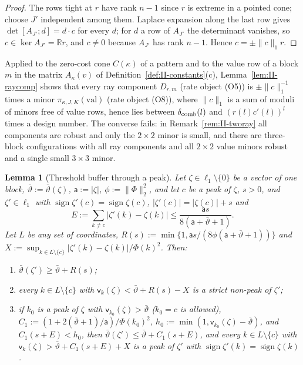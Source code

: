 \documentclass[10pt]{amsart}
\newtheorem{lemma}[theorem]{Lemma}
\theoremstyle{definition}
\theoremstyle{remark}
\newcommand{\sgn}{\operatorname{sign}}
\newcommand{\R}{\mathbb R}
\begin{document}
\begin{proof}
The rows tight at $r$ have rank $n-1$ since $r$ is extreme in a pointed
cone; choose $J'$ independent among them.  Laplace expansion along the last
row gives $\det[A_{J'};d]=d\cdot c$ for every $d$; for $d$ a row of $A_{J'}$
the determinant vanishes, so $c\in\ker A_{J'}=\R r$, and $c\ne0$ because
$A_{J'}$ has rank $n-1$.  Hence $c=\pm\|c\|_1r$.
\end{proof}

Applied to the zero-cost cone $C(\kappa)$ of a pattern and to the value row
of a block $m$ in the matrix $A_\kappa(v)$ of
Definition~\ref{def:II-constants}(c), Lemma~\ref{lem:II-raycomp} shows that
every ray component $D_{r,m}$ (rate object (O5)) is $\pm\|c\|_1^{-1}$ times
a minor $\pi_{\kappa,J,K}(\mathrm{val})$ (rate object (O8)), where $\|c\|_1$ is
a sum of moduli of minors free of value rows, hence lies between
$\delta_{\rm comb}(l)$ and $(r(l)c'(l))^l$ times a design number.  The
converse fails: in Remark~\ref{rem:II-tworay} all components are robust and
only the $2\times2$ minor is small, and there are three-block configurations
with all ray components and all $2\times2$ value minors robust and a single
small $3\times3$ minor.

\begin{lemma}[Threshold buffer through a peak]\label{lem:II-QB}
Let $\zeta\in\ell_1\setminus\{0\}$ be a vector of one block,
$\bar\vartheta:=\bar\vartheta(\zeta)$, $\mathsf a:=|\zeta|$,
$\phi:=\|\Phi\|_2^2$, and let $c$ be a peak of $\zeta$, $s>0$, and
$\zeta'\in\ell_1$ with $\sgn\zeta'(c)=\sgn\zeta(c)$, $|\zeta'(c)|=|\zeta(c)|+s$
and
\[
 E:=\sum_{k\ne c}|\zeta'(k)-\zeta(k)|\le\frac{\mathsf as}{8(\mathsf a+\bar\vartheta+1)} .
\]
Let $L$ be any set of coordinates, $R(s):=\min\{1,\mathsf as/(8\phi(\mathsf a+
\bar\vartheta+1))\}$ and $X:=\sup_{k\in L\setminus\{c\}}|\zeta'(k)-\zeta(k)|/
\Phi(k)^2$.  Then:
\begin{enumerate}
\item[(a)] $\bar\vartheta(\zeta')\ge\bar\vartheta+R(s)$;
\item[(b)] every $k\in L\setminus\{c\}$ with $\mathsf v_k(\zeta)<\bar\vartheta+
R(s)-X$ is a strict non-peak of $\zeta'$;
\item[(c)] if $k_0$ is a peak of $\zeta$ with $\mathsf v_{k_0}(\zeta)>\bar\vartheta$
\textup{(}$k_0=c$ is allowed\textup{)}, $C_1:=(1+2(\bar\vartheta+1)/\mathsf a)/
\Phi(k_0)^2$, $h_0:=\min(1,\mathsf v_{k_0}(\zeta)-\bar\vartheta)$, and
$C_1(s+E)<h_0$, then $\bar\vartheta(\zeta')\le\bar\vartheta+C_1(s+E)$, and every
$k\in L\setminus\{c\}$ with $\mathsf v_k(\zeta)>\bar\vartheta+C_1(s+E)+X$ is a
peak of $\zeta'$ with $\sgn\zeta'(k)=\sgn\zeta(k)$.
\end{enumerate}
\end{lemma}
\end{document}
